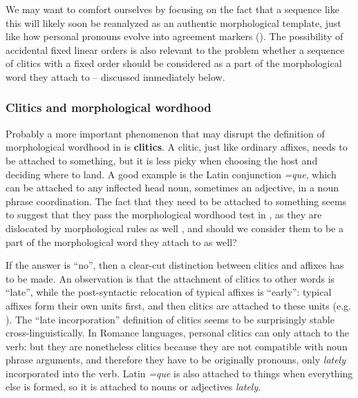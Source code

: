 \documentclass[a4paper, oneside, scheme=plain, 12pt]{article}
\newcommand*{\citepage}[1]{p.~{#1}}
\newcommand*{\concept}[1]{\textbf{#1}}
\newcommand{\form}[1]{\emph{#1}}
\begin{document}
We may want to comfort ourselves by focusing on the fact that a sequence like this will likely soon be reanalyzed as an authentic morphological template,
just like how personal pronouns evolve into agreement markers
().
The possibility of accidental fixed linear orders
is also relevant to the problem whether a sequence of clitics with a fixed order
should be considered as a part of the morphological word they attach to -- discussed immediately below.

\subsubsection{Clitics and morphological wordhood}\label{sec:morphological-wordhood-clitics}

Probably a more important phenomenon that may disrupt the definition of morphological wordhood in  is \concept{clitics}.
A clitic, just like ordinary affixes, needs to be attached to something,
but it is less picky when choosing the host and deciding where to land.
A good example is the Latin conjunction \form{=que},
which can be attached to any inflected head noun,
sometimes an adjective, in a noun phrase coordination.
The fact that they need to be attached to something
seems to suggest that they pass the morphological wordhood test in ,
as they are dislocated by morphological rules as well \citep{harley1999distributed},
and should we consider them to be a part of the morphological word they attach to as well?

If the answer is ``no'', then a clear-cut distinction between clitics and affixes has to be made.
An observation is that the attachment of clitics to other words is ``late'',
while the post-syntactic relocation of typical affixes is ``early'':
typical affixes form their own units first, and then clitics are attached to these units
(e.g. \citealt[\citepage{485}]{jacques2021grammar}).
The ``late incorporation'' definition of clitics seems to be surprisingly stable cross-linguistically.
In Romance languages, personal clitics can only attach to the verb:
but they are nonetheless clitics because they are not compatible with noun phrase arguments,
and therefore they have to be originally pronouns,
only \emph{lately} incorporated into the verb.
Latin \form{=que} is also attached to things when everything else is formed,
so it is attached to nouns or adjectives \emph{lately}.
\end{document}
